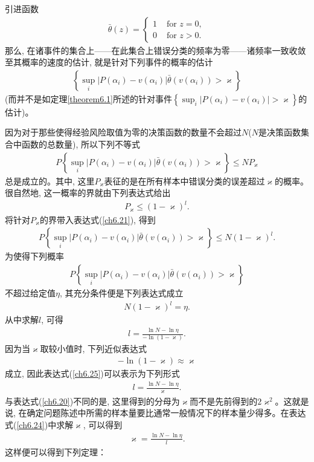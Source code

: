 引进函数
\begin{align}
\bar{\theta}(z)=\left\{\begin{array}{ll}
1 & \text { for } z=0 ,\\
0 & \text { for } z>0.
\end{array}\right.
\end{align}
那么, 在诸事件的集合上——在此集合上错误分类的频率为零——诸频率一致收敛至其概率的速度的估计, 就是针对下列事件的概率的估计
\begin{align}
\left\{\sup _{i}\left|P\left(\alpha_{i}\right)-v\left(\alpha_{i}\right)\right| \bar{\theta}\left(v\left(\alpha_{i}\right)\right)>\varkappa\right\}
\end{align}
(而并不是如定理\ref{theorem6.1}所述的针对事件$\left\{\sup _{i}\left|P\left(\alpha_{i}\right)-v\left(\alpha_{i}\right)\right| > \varkappa\right\}$的估计)。

因为对于那些使得经验风险取值为零的决策函数的数量不会超过$N$($N$是决策函数集合中函数的总数量), 所以下列不等式
\begin{align}\label{ch6.21}
P\left\{\sup _{i}\left|P\left(\alpha_{i}\right)-v\left(\alpha_{i}\right)\right| \bar{\theta}\left(v\left(\alpha_{i}\right)\right)>\varkappa\right\} \leq N P_{\varkappa}
\end{align}
总是成立的。其中, 这里$P_{\varkappa}$表征的是在所有样本中错误分类的误差超过$\varkappa$的概率。很自然地, 这一概率的界就由下列表达式给出
\begin{align}\label{ch6.22}
P_{\varkappa} \leq(1-\varkappa)^{l}.
\end{align}
将针对$P_{\varkappa}$的界带入表达式(\ref{ch6.21}), 得到
\begin{align}\label{ch6.23}
P\left\{\sup _{i}\left|P\left(\alpha_{i}\right)-v\left(\alpha_{i}\right)\right| \bar{\theta}\left(v\left(\alpha_{i}\right)\right)>\varkappa\right\} \leq N(1-\varkappa)^{l}.
\end{align}
为使得下列概率
\begin{align}
P\left\{\sup _{i}\left|P\left(\alpha_{i}\right)-v\left(\alpha_{i}\right)\right| \bar{\theta}\left(v\left(\alpha_{i}\right)\right)>\varkappa\right\}
\end{align}
不超过给定值$\eta$, 其充分条件便是下列表达式成立
\begin{align}\label{ch6.24}
N(1-\varkappa)^{l}=\eta.
\end{align}
从中求解$l$, 可得
\begin{align}\label{ch6.25}
l=\frac{\ln N-\ln \eta}{-\ln (1-\varkappa)}.
\end{align}
因为当$\varkappa$取较小值时, 下列近似表达式
\begin{align}
-\ln (1-\varkappa) \approx \varkappa
\end{align}
成立, 因此表达式(\ref{ch6.25})可以表示为下列形式
\begin{align}
l=\frac{\ln N-\ln \eta}{\varkappa}.
\end{align}
与表达式(\ref{ch6.20})不同的是, 这里得到的分母为$\varkappa$而不是先前得到的$2\varkappa^2$。这就是说, 在确定问题陈述中所需的样本量要比通常一般情况下的样本量少得多。在表达式(\ref{ch6.24})中求解$\varkappa$, 可以得到
\begin{align}
\varkappa=\frac{\ln N-\ln \eta}{l}.
\end{align}
这样便可以得到下列定理：

